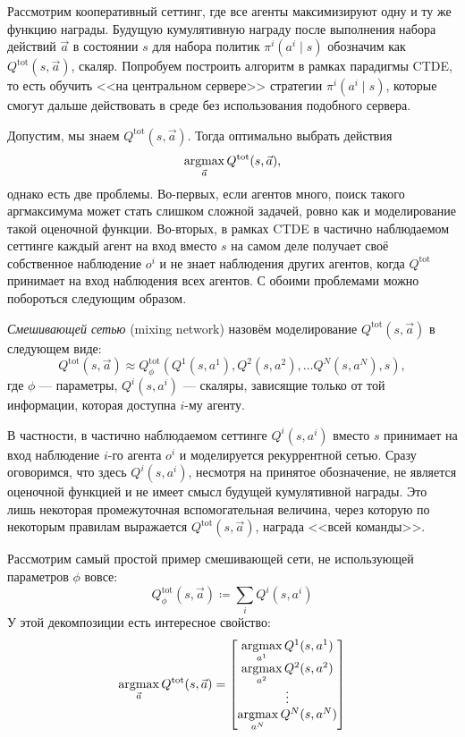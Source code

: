 Рассмотрим кооперативный сеттинг, где все агенты максимизируют одну и ту же функцию награды. Будущую кумулятивную награду после выполнения набора действий $\vec{a}$ в состоянии $s$ для набора политик $\pi^i(a^i \mid s)$ обозначим как $Q^{\mathrm{tot}}(s, \vec{a})$, скаляр. Попробуем построить алгоритм в рамках парадигмы CTDE, то есть обучить <<на центральном сервере>> стратегии $\pi^i(a^i \mid s)$, которые смогут дальше действовать в среде без использования подобного сервера.

Допустим, мы знаем $Q^{\mathrm{tot}}(s, \vec{a})$. Тогда оптимально выбрать действия
$$\mathop{\mathrm{argmax}}_{\vec{a}} Q^{\mathrm{tot}}(s, \vec{a}),$$
однако есть две проблемы. Во-первых, если агентов много, поиск такого аргмаксимума может стать слишком сложной задачей, ровно как и моделирование такой оценочной функции. Во-вторых, в рамках CTDE в частично наблюдаемом сеттинге каждый агент на вход вместо $s$ на самом деле получает своё собственное наблюдение $o^i$ и не знает наблюдения других агентов, когда $Q^{\mathrm{tot}}$ принимает на вход наблюдения всех агентов. С обоими проблемами можно побороться следующим образом.

\begin{definition}
\emph{Смешивающей сетью} (mixing network) назовём моделирование $Q^{\mathrm{tot}}(s, \vec{a})$ в следующем виде:
\begin{equation}\label{vdn}
Q^{\mathrm{tot}}(s, \vec{a}) \approx Q^{\mathrm{tot}}_{\phi}(Q^1(s, a^1), Q^2(s, a^2), \dots Q^N(s, a^N), s),
\end{equation}
где $\phi$ --- параметры, $Q^i(s, a^i)$ --- скаляры, зависящие только от той информации, которая доступна $i$-му агенту.
\end{definition}

В частности, в частично наблюдаемом сеттинге $Q^i(s, a^i)$ вместо $s$ принимает на вход наблюдение $i$-го агента $o^i$ и моделируется рекуррентной сетью. Сразу оговоримся, что здесь $Q^i(s, a^i)$, несмотря на принятое обозначение, не является оценочной функцией и не имеет смысл будущей кумулятивной награды. Это лишь некоторая промежуточная вспомогательная величина, через которую по некоторым правилам выражается $Q^{\mathrm{tot}}(s, \vec{a})$, награда <<всей команды>>.

\begin{example} Рассмотрим самый простой пример смешивающей сети, не использующей параметров $\phi$ вовсе:
$$Q^{\mathrm{tot}}_{\phi}(s, \vec{a}) \coloneqq \sum_i Q^i(s, a^i)$$
У этой декомпозиции есть интересное свойство: 
\begin{equation}\label{consistent_vdn}
\mathop{\mathrm{argmax}}_{\vec{a}} Q^{\mathrm{tot}}(s, \vec{a}) = \left[ 
\begin{matrix}
\mathop{\mathrm{argmax}}\limits_{a^1} Q^1(s, a^1) \\
\mathop{\mathrm{argmax}}\limits_{a^2} Q^2(s, a^2) \\
\vdots \\
\mathop{\mathrm{argmax}}\limits_{a^N} Q^N(s, a^N) \\
\end{matrix}
\right]
\end{equation}
\end{example}

